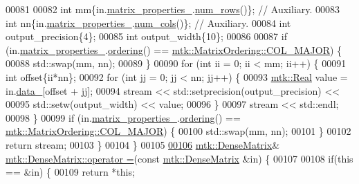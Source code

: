 \begin{DoxyCode}
00081 
00082   \textcolor{keywordtype}{int} mm\{in.\hyperlink{classmtk_1_1DenseMatrix_a481c8d09af685a5ba67acefdcaa810cc}{matrix\_properties\_}.\hyperlink{classmtk_1_1Matrix_ab308b25b48e4fcd39fc60e0c3fc66dea}{num\_rows}()\};  \textcolor{comment}{// Auxiliary.}
00083   \textcolor{keywordtype}{int} nn\{in.\hyperlink{classmtk_1_1DenseMatrix_a481c8d09af685a5ba67acefdcaa810cc}{matrix\_properties\_}.\hyperlink{classmtk_1_1Matrix_a2160118d0edf51cf2aaa806ee1b915f8}{num\_cols}()\};  \textcolor{comment}{// Auxiliary.}
00084   \textcolor{keywordtype}{int} output\_precision\{4\};
00085   \textcolor{keywordtype}{int} output\_width\{10\};
00086 
00087   \textcolor{keywordflow}{if} (in.\hyperlink{classmtk_1_1DenseMatrix_a481c8d09af685a5ba67acefdcaa810cc}{matrix\_properties\_}.\hyperlink{classmtk_1_1Matrix_a13cd17621652cd5551ff98549bd94df7}{ordering}() == 
      \hyperlink{namespacemtk_ga622801bd9f912d0f976c3e383f5f581ca34d2765ffc490951febdcca04bc4f7cd}{mtk::MatrixOrdering::COL\_MAJOR}) \{
00088     std::swap(mm, nn);
00089   \}
00090   \textcolor{keywordflow}{for} (\textcolor{keywordtype}{int} ii = 0; ii < mm; ii++) \{
00091     \textcolor{keywordtype}{int} offset\{ii*nn\};
00092     \textcolor{keywordflow}{for} (\textcolor{keywordtype}{int} jj = 0; jj < nn; jj++) \{
00093       \hyperlink{group__c01-roots_gac080bbbf5cbb5502c9f00405f894857d}{mtk::Real} value = in.\hyperlink{classmtk_1_1DenseMatrix_a7893e4e5c8d2e2de32b156177e78cb6f}{data\_}[offset + jj];
00094       stream << std::setprecision(output\_precision) <<
00095         std::setw(output\_width) << value;
00096     \}
00097     stream << std::endl;
00098   \}
00099   \textcolor{keywordflow}{if} (in.\hyperlink{classmtk_1_1DenseMatrix_a481c8d09af685a5ba67acefdcaa810cc}{matrix\_properties\_}.\hyperlink{classmtk_1_1Matrix_a13cd17621652cd5551ff98549bd94df7}{ordering}() == 
      \hyperlink{namespacemtk_ga622801bd9f912d0f976c3e383f5f581ca34d2765ffc490951febdcca04bc4f7cd}{mtk::MatrixOrdering::COL\_MAJOR}) \{
00100     std::swap(mm, nn);
00101   \}
00102   \textcolor{keywordflow}{return} stream;
00103 \}
00104 \}
00105 
\hypertarget{mtk__dense__matrix_8cc_source_l00106}{}\hyperlink{classmtk_1_1DenseMatrix_a0d27dc7c4d2c49f391017e392345ced0}{00106} \hyperlink{classmtk_1_1DenseMatrix}{mtk::DenseMatrix}& \hyperlink{classmtk_1_1DenseMatrix_a0d27dc7c4d2c49f391017e392345ced0}{mtk::DenseMatrix::operator =}(\textcolor{keyword}{const} 
      \hyperlink{classmtk_1_1DenseMatrix}{mtk::DenseMatrix} &in) \{
00107 
00108   \textcolor{keywordflow}{if}(\textcolor{keyword}{this} == &in) \{
00109     \textcolor{keywordflow}{return} *\textcolor{keyword}{this};

\end{DoxyCode}
